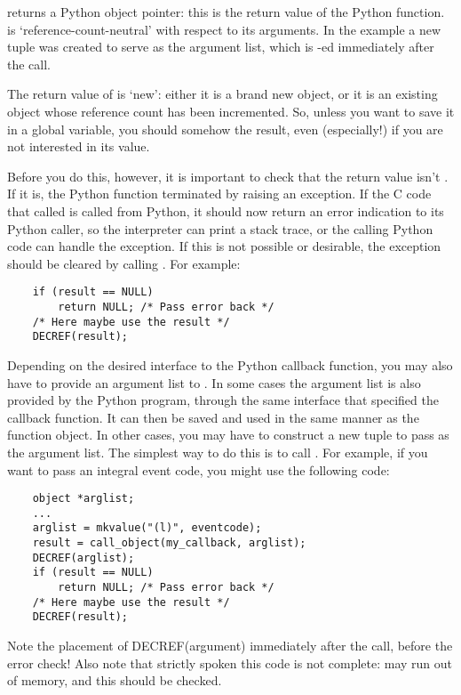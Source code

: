  returns a Python object pointer: this is
the return value of the Python function.   is
`reference-count-neutral' with respect to its arguments.  In the
example a new tuple was created to serve as the argument list, which
is -ed immediately after the call.

The return value of  is `new': either it is a
brand new object, or it is an existing object whose reference count
has been incremented.  So, unless you want to save it in a global
variable, you should somehow  the result, even
(especially!) if you are not interested in its value.

Before you do this, however, it is important to check that the return
value isn't .  If it is, the Python function terminated by raising
an exception.  If the C code that called  is
called from Python, it should now return an error indication to its
Python caller, so the interpreter can print a stack trace, or the
calling Python code can handle the exception.  If this is not possible
or desirable, the exception should be cleared by calling
.  For example:

\begin{verbatim}
    if (result == NULL)
        return NULL; /* Pass error back */
    /* Here maybe use the result */
    DECREF(result); 
\end{verbatim}

Depending on the desired interface to the Python callback function,
you may also have to provide an argument list to .
In some cases the argument list is also provided by the Python
program, through the same interface that specified the callback
function.  It can then be saved and used in the same manner as the
function object.  In other cases, you may have to construct a new
tuple to pass as the argument list.  The simplest way to do this is to
call .  For example, if you want to pass an integral
event code, you might use the following code:

\begin{verbatim}
    object *arglist;
    ...
    arglist = mkvalue("(l)", eventcode);
    result = call_object(my_callback, arglist);
    DECREF(arglist);
    if (result == NULL)
        return NULL; /* Pass error back */
    /* Here maybe use the result */
    DECREF(result);
\end{verbatim}

Note the placement of DECREF(argument) immediately after the call,
before the error check!  Also note that strictly spoken this code is
not complete:  may run out of memory, and this should
be checked.


